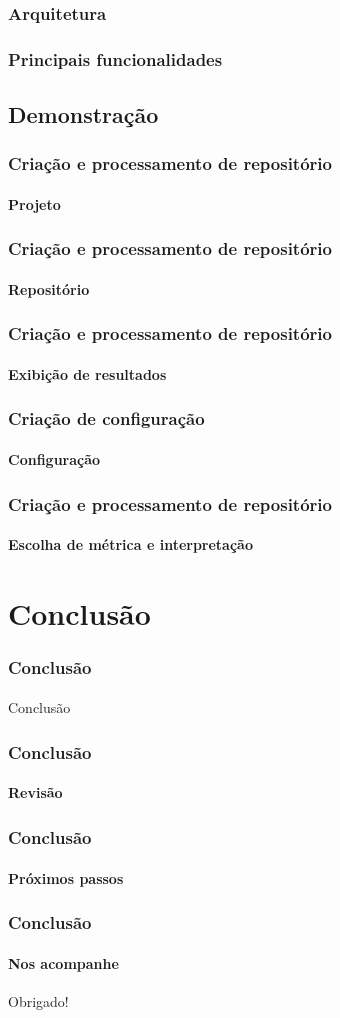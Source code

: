\documentclass{beamer}
\begin{document}
\begin{frame}
  \frametitle{Arquitetura}
  \framesubtitle{}
\end{frame}

\begin{frame}
  \frametitle{Principais funcionalidades}
  \framesubtitle{}
\end{frame}

  \subsection{Demonstração}
  \begin{frame}
    \frametitle{Criação e processamento de repositório}
    \framesubtitle{Projeto}
  \end{frame}

  \begin{frame}
    \frametitle{Criação e processamento de repositório}
    \framesubtitle{Repositório}
  \end{frame}

  \begin{frame}
    \frametitle{Criação e processamento de repositório}
    \framesubtitle{Exibição de resultados}
  \end{frame}

  \begin{frame}
    \frametitle{Criação de configuração}
    \framesubtitle{Configuração}
  \end{frame}

  \begin{frame}
    \frametitle{Criação e processamento de repositório}
    \framesubtitle{Escolha de métrica e interpretação}
  \end{frame}

\section{Conclusão}
\begin{frame}
  \frametitle{Conclusão}
  \framesubtitle{}

  Conclusão
\end{frame}

\begin{frame}
  \frametitle{Conclusão}
  \framesubtitle{Revisão}
\end{frame}

\begin{frame}
  \frametitle{Conclusão}
  \framesubtitle{Próximos passos}
\end{frame}

\begin{frame}
  \frametitle{Conclusão}
  \framesubtitle{Nos acompanhe}

  Obrigado!
\end{frame}
\end{document}
